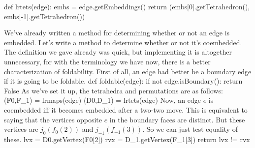 \documentclass[10pt,twocolumn]{article}%
\theoremstyle{definition}
\begin{document}
def lrtets(edge):
  embs = edge.getEmbeddings()
  return (embs[0].getTetrahedron(),\\
          embs[-1].getTetrahedron())

\nwendcode{}\nwdocspar
We've already written a method for
determining whether or not an edge is embedded.
Let's write a method to determine whether or not
it's coembedded.
\nwenddocs{}\nwdocspar
The definition we gave already
was quick, but implementing it 
is altogether unnecessary, for with
the terminology we have now, there is
a better characterization of foldability.
First of all, an edge had better be
a boundary edge if it is going to be foldable.
\nwenddocs{}\endmoddef\nwstartdeflinemarkup\nwenddeflinemarkup
def foldable(edge):
  if not edge.isBoundary():
    return False
\nwendcode{}\nwdocspar
As we've set it up, the tetrahedra
and permutations are as follows:
\nwenddocs{}\plusendmoddef\nwstartdeflinemarkup\nwenddeflinemarkup
  (F0,F_1) = lrmaps(edge)
  (D0,D_1) = lrtets(edge)
\nwendcode{}\nwdocspar
Now, an edge $e$ is coembedded iff it becomes
embedded after a two-two move. This is equivalent
to saying that the vertices opposite $e$ in the
boundary faces are distinct. But these vertices
are $j_0(f_0(2))$ and $j_{-1}(f_{-1}(3))$. So
we can just test equality of these.
\nwenddocs{}\plusendmoddef\nwstartdeflinemarkup\nwenddeflinemarkup
  lvx = D0.getVertex(F0[2])
  rvx = D_1.getVertex(F_1[3])
  return lvx != rvx
\end{document}
